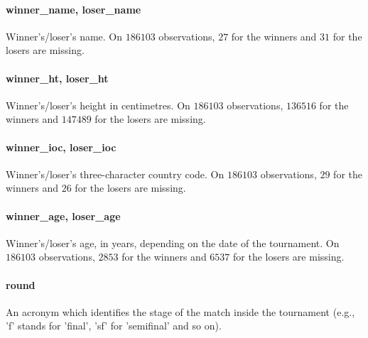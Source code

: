 \documentclass{article}
\begin{document}
\paragraph{winner\_name, loser\_name}
Winner's/loser's name. On $186103$ observations, $27$ for the winners and $31$ for the losers are missing.

\paragraph{winner\_ht, loser\_ht}
Winner's/loser's height in centimetres. On $186103$ observations, $136516$ for the winners and $147489$ for the losers are missing.

\paragraph{winner\_ioc, loser\_ioc}
Winner's/loser's three-character country code. On $186103$ observations, $29$ for the winners and $26$ for the losers are missing.

\paragraph{winner\_age, loser\_age}
Winner's/loser's age, in years, depending on the date of the tournament. On $186103$ observations, $2853$ for the winners and $6537$ for the losers are missing.

\paragraph{round}
An acronym which identifies the stage of the match inside the tournament (e.g., 'f' stands for 'final', 'sf' for 'semifinal' and so on).
\end{document}
